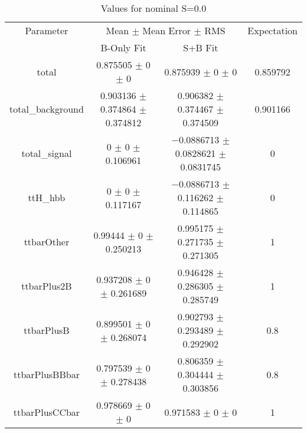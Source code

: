 \begin{table}
\centering
\caption{Values for nominal S=0.0}
\begin{tabular}{cccc}
\toprule
Parameter & \multicolumn{2}{c}{Mean $\pm$ Mean Error $\pm$ RMS} & Expectation\\
 & B-Only Fit & S+B Fit & \\
\midrule
total & \num{0.875505} $\pm$ \num{0} $\pm$ \num{0} & \num{0.875939} $\pm$ \num{0} $\pm$ \num{0} & \num{0.859792}\\
total\_background & \num{0.903136} $\pm$ \num{0.374864} $\pm$ \num{0.374812} & \num{0.906382} $\pm$ \num{0.374467} $\pm$ \num{0.374509} & \num{0.901166}\\
total\_signal & \num{0} $\pm$ \num{0} $\pm$ \num{0.106961} & \num{-0.0886713} $\pm$ \num{0.0828621} $\pm$ \num{0.0831745} & \num{0}\\
ttH\_hbb & \num{0} $\pm$ \num{0} $\pm$ \num{0.117167} & \num{-0.0886713} $\pm$ \num{0.116262} $\pm$ \num{0.114865} & \num{0}\\
ttbarOther & \num{0.99444} $\pm$ \num{0} $\pm$ \num{0.250213} & \num{0.995175} $\pm$ \num{0.271735} $\pm$ \num{0.271305} & \num{1}\\
ttbarPlus2B & \num{0.937208} $\pm$ \num{0} $\pm$ \num{0.261689} & \num{0.946428} $\pm$ \num{0.286305} $\pm$ \num{0.285749} & \num{1}\\
ttbarPlusB & \num{0.899501} $\pm$ \num{0} $\pm$ \num{0.268074} & \num{0.902793} $\pm$ \num{0.293489} $\pm$ \num{0.292902} & \num{0.8}\\
ttbarPlusBBbar & \num{0.797539} $\pm$ \num{0} $\pm$ \num{0.278438} & \num{0.806359} $\pm$ \num{0.304444} $\pm$ \num{0.303856} & \num{0.8}\\
ttbarPlusCCbar & \num{0.978669} $\pm$ \num{0} $\pm$ \num{0} & \num{0.971583} $\pm$ \num{0} $\pm$ \num{0} & \num{1}\\
\bottomrule
\end{tabular}
\end{table}